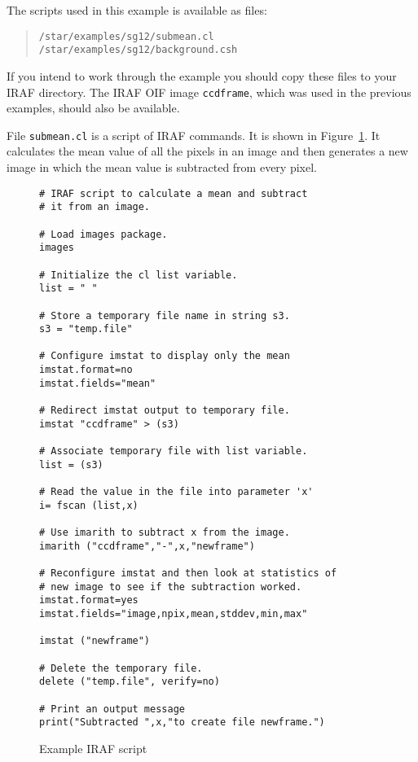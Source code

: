 \documentclass[twoside,11pt]{article}
\begin{document}
The scripts used in this example is available as files:

\begin{quote}
{\tt /star/examples/sg12/submean.cl} \\
{\tt /star/examples/sg12/background.csh}
\end{quote}

If you intend to work through the example you should copy these files
to your IRAF directory.  The IRAF OIF image {\tt ccdframe}, which was
used in the previous examples, should also be available.

File {\tt submean.cl} is a script of IRAF commands.  It is shown
in Figure~\ref{SUBMEAN}.  It calculates the mean value of all the
pixels in an image and then generates a new image in which the mean
value is subtracted from every pixel.

\begin{figure}[htbp]

\begin{verbatim}
# IRAF script to calculate a mean and subtract
# it from an image.

# Load images package.
images

# Initialize the cl list variable.
list = " "

# Store a temporary file name in string s3.
s3 = "temp.file"

# Configure imstat to display only the mean
imstat.format=no
imstat.fields="mean"

# Redirect imstat output to temporary file.
imstat "ccdframe" > (s3)

# Associate temporary file with list variable.
list = (s3)

# Read the value in the file into parameter 'x'
i= fscan (list,x)

# Use imarith to subtract x from the image.
imarith ("ccdframe","-",x,"newframe")

# Reconfigure imstat and then look at statistics of
# new image to see if the subtraction worked.
imstat.format=yes
imstat.fields="image,npix,mean,stddev,min,max"

imstat ("newframe")

# Delete the temporary file.
delete ("temp.file", verify=no)

# Print an output message
print("Subtracted ",x,"to create file newframe.")
\end{verbatim}

\caption{Example IRAF script
\label{SUBMEAN} }

\end{figure}
\end{document}
